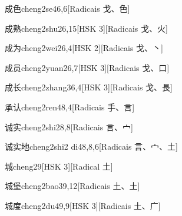 \begin{entry}{成色}{cheng2se4}{6,6}[Radicais ⼽、⾊]
\end{entry}

\begin{entry}{成熟}{cheng2shu2}{6,15}[HSK 3][Radicais ⼽、⽕]
\end{entry}

\begin{entry}{成为}{cheng2wei2}{6,4}[HSK 2][Radicais ⼽、⼂]
\end{entry}

\begin{entry}{成员}{cheng2yuan2}{6,7}[HSK 3][Radicais ⼽、⼝]
\end{entry}

\begin{entry}{成长}{cheng2zhang3}{6,4}[HSK 3][Radicais ⼽、⾧]
\end{entry}

\begin{entry}{承认}{cheng2ren4}{8,4}[Radicais ⼿、⾔]
\end{entry}

\begin{entry}{诚实}{cheng2shi2}{8,8}[Radicais ⾔、⼧]
\end{entry}

\begin{entry}{诚实地}{cheng2shi2 di4}{8,8,6}[Radicais ⾔、⼧、⼟]
\end{entry}

\begin{entry}{城}{cheng2}{9}[HSK 3][Radical ⼟]
\end{entry}

\begin{entry}{城堡}{cheng2bao3}{9,12}[Radicais ⼟、⼟]
\end{entry}

\begin{entry}{城度}{cheng2du4}{9,9}[HSK 3][Radicais ⼟、⼴]
\end{entry}


